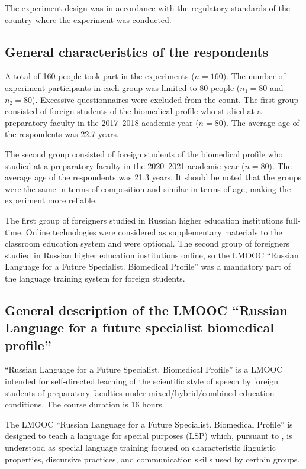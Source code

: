 \documentclass[english]{textolivre}
\begin{document}
The experiment design was in accordance with the regulatory standards of the country where the experiment was conducted.

\subsection{General characteristics of the respondents}\label{sec-organizacao}
A total of 160 people took part in the experiments ($n = 160$). The number of experiment participants in each group was limited to 80 people ($n₁ = 80$ and $n₂ = 80$). Excessive questionnaires were excluded from the count. The first group consisted of foreign students of the biomedical profile who studied at a preparatory faculty in the 2017–2018 academic year ($n = 80$). The average age of the respondents was 22.7 years.

The second group consisted of foreign students of the biomedical profile who studied at a preparatory faculty in the 2020–2021 academic year ($n = 80$). The average age of the respondents was 21.3 years. It should be noted that the groups were the same in terms of composition and similar in terms of age, making the experiment more reliable.

The first group of foreigners studied in Russian higher education institutions full-time. Online technologies were considered as supplementary materials to the classroom education system and were optional. The second group of foreigners studied in Russian higher education institutions online, so the LMOOC “Russian Language for a Future Specialist. Biomedical Profile” was a mandatory part of the language training system for foreign students.

\subsection{General description of the LMOOC “Russian Language for a future specialist biomedical profile”}\label{sec-organizacao-latex}
“Russian Language for a Future Specialist. Biomedical Profile” is a LMOOC intended for self‑directed learning of the scientific style of speech by foreign students of preparatory faculties under mixed/hybrid/combined education conditions. The course duration is 16 hours.

The LMOOC “Russian Language for a Future Specialist. Biomedical Profile” is designed to teach a language for special purposes (LSP) which, pursuant to \textcite{chapelle_genre_2018}, is understood as special language training focused on characteristic linguistic properties, discursive practices, and communication skills used by certain groups.
\end{document}
